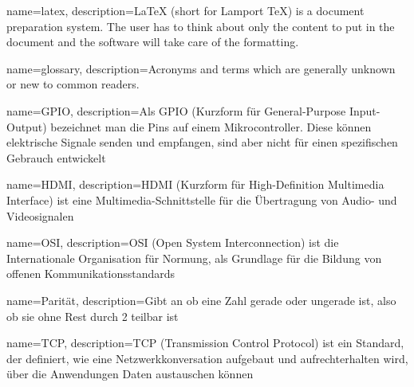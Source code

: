 











{
	name=latex,
	description={LaTeX (short for Lamport TeX) is a document preparation system. The user has to think about only the content to put in the document and the software will take care of the formatting. }
}

{
	name=glossary,
	description={Acronyms and terms which are generally unknown or new to common readers.}
}

{
	name=GPIO,
	description={Als GPIO (Kurzform für General-Purpose Input-Output) bezeichnet man die Pins auf einem Mikrocontroller. Diese können elektrische Signale senden und empfangen, sind aber nicht für einen spezifischen Gebrauch entwickelt}
}

{
	name=HDMI,
	description={HDMI (Kurzform für High-Definition Multimedia Interface) ist eine Multimedia-Schnittstelle für die Übertragung von Audio- und Videosignalen}
}

{
	name=OSI,
	description={OSI (Open System Interconnection) ist die Internationale Organisation für Normung, als Grundlage für die Bildung von offenen Kommunikationsstandards}
}

{
	name=Parität,
	description={Gibt an ob eine Zahl gerade oder ungerade ist, also ob sie ohne Rest durch 2 teilbar ist \cite{Parity_Mathematik:o.J.}}
}

{
	name=TCP,
	description={TCP (Transmission Control Protocol) ist ein Standard, der definiert, wie eine Netzwerkkonversation aufgebaut und aufrechterhalten wird, über die Anwendungen Daten austauschen können}
}

